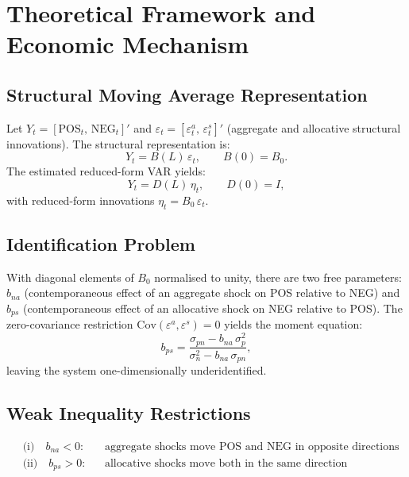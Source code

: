 \section{Theoretical Framework and Economic Mechanism}

\subsection*{Structural Moving Average Representation}

Let $Y_t=[\text{POS}_t,\,\text{NEG}_t]'$ and
$\varepsilon_t=[\varepsilon^a_t,\,\varepsilon^s_t]'$ (aggregate and
allocative structural innovations). The structural representation is:
\begin{equation}
  Y_t = B(L)\,\varepsilon_t, \qquad B(0) = B_0.
  \label{eq:structural_ma}
\end{equation}
The estimated reduced-form VAR yields:
\begin{equation}
  Y_t = D(L)\,\eta_t, \qquad D(0) = I,
  \label{eq:rf_var}
\end{equation}
with reduced-form innovations $\eta_t = B_0\,\varepsilon_t$.

\subsection*{Identification Problem}

With diagonal elements of $B_0$ normalised to unity, there are two free
parameters: $b_{na}$ (contemporaneous effect of an aggregate shock on POS
relative to NEG) and $b_{ps}$ (contemporaneous effect of an allocative shock
on NEG relative to POS). The zero-covariance restriction
$\text{Cov}(\varepsilon^a,\varepsilon^s)=0$ yields the moment equation:
\begin{equation}
  b_{ps} = \frac{\sigma_{pn} - b_{na}\,\sigma_p^2}{\sigma_n^2 - b_{na}\,\sigma_{pn}},
  \label{eq:dh99_bps}
\end{equation}
leaving the system one-dimensionally underidentified.

\subsection*{Weak Inequality Restrictions}

\begin{align}
  &\text{(i)}\quad b_{na} < 0:
    &&\text{aggregate shocks move POS and NEG in opposite directions}\\
  &\text{(ii)}\quad b_{ps} > 0:
    &&\text{allocative shocks move both in the same direction}
\end{align}

